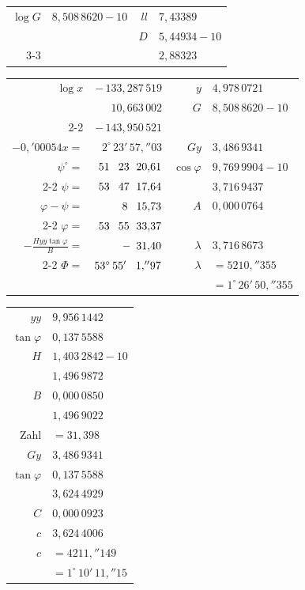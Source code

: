 \documentclass[12pt,a4paper]{article}
\newcommand{\tang}{\tan}
\theoremstyle{plain}
\theoremstyle{definition}
\theoremstyle{remark}
\begin{document}
\begin{center}
\begin{tabular}{r@{\ $=$\ }r@{\qquad}r@{\ldots\ldots\ }l}
$\log G$ & $8{,}508\,8620 - 10$ & $ll$ & $7{,}43389$ \\
& & $D$ & $5{,}44934 - 10$ \\
\cline{3-3}
& & & $2{,}88323$
\end{tabular}
\end{center}

\begin{center}
\begin{tabular}{r@{\ $=$\ }r@{\qquad}r@{\ldots\ldots\ }l}
$\log x$ & $-\,133{,}287\,519$ & $y$ & $4{,}978\,0721$ \\
& $10{,}663\,002$ & $G$ & $8{,}508\,8620 - 10$ \\
\cline{2-2}
& $-\,143{,}950\,521$ & & \hrulefill \\
$-0{,}'00054x =$ & $2^{\circ}\,23'\,57{,}''03$ & $Gy$ & $3{,}486\,9341$ \\
$\psi^{\circ} =$ & $51\hphantom{^{\circ}}\ 23\hphantom{'}\ 20{,}61$ & $\cos \varphi$ & $9{,}769\,9904 - 10$ \\
\cline{2-2}
$\psi =$ & $53\hphantom{^{\circ}}\ 47\hphantom{'}\ 17{,}64$ & & $3{,}716\,9437$ \\
$\varphi - \psi =$ & $\hphantom{5}8\hphantom{^{\circ}}\ 15{,}73$ & $A$ & $0{,}000\,0764$ \\
\cline{2-2}
$\varphi =$ & $53\hphantom{^{\circ}}\ 55\hphantom{'}\ 33{,}37$ & & \hrulefill \\
$-\frac{Hyy \tang \varphi}{B} =$ & $-\hphantom{5}31{,}40$ & $\lambda$ & $3{,}716\,8673$ \\
\cline{2-2}
$\Phi =$ & $53^{\circ}\,55'\hphantom{''}\ 1{,}''97$ & $\lambda$ & $= 5210{,}''355$ \\
& & & $= 1^{\circ}\,26'\,50{,}''355$ \\
\end{tabular}
\end{center}

\begin{center}
\begin{tabular}{r@{\ldots\ldots\ }l}
$yy$ & $9{,}956\,1442$ \\
$\tang \varphi$ & $0{,}137\,5588$ \\
\hline
$H$ & $1{,}403\,2842 - 10$ \\
& $1{,}496\,9872$ \\
$B$ & $0{,}000\,0850$ \\
\hline
& $1{,}496\,9022$ \\
Zahl & $= 31{,}398$ \\
\hline
$Gy$ & $3{,}486\,9341$ \\
$\tang \varphi$ & $0{,}137\,5588$ \\
\hline
& $3{,}624\,4929$ \\
$C$ & $0{,}000\,0923$ \\
\hline
$c$ & $3{,}624\,4006$ \\
$c$ & $= 4211{,}''149$ \\
& $= 1^{\circ}\,10'\,11{,}''15$
\end{tabular}
\end{center}
\end{document}
